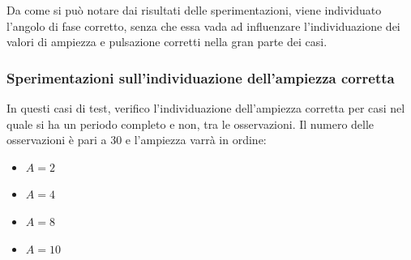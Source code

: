 \documentclass[a4paper,12pt]{report}
\begin{document}
Da come si può notare dai risultati delle sperimentazioni, viene individuato l'angolo di fase corretto, senza che essa vada ad influenzare l'individuazione dei valori di ampiezza e pulsazione corretti nella gran parte dei casi.

\subsubsection{Sperimentazioni sull'individuazione dell'ampiezza corretta}
In questi casi di test, verifico l'individuazione dell'ampiezza corretta per casi nel quale si ha un periodo completo e non, tra le osservazioni. Il numero delle osservazioni è pari a 30 e  l'ampiezza varrà in ordine:
\begin{itemize}
  \item $A = 2$
  \item $A = 4$
  \item $A = 8$
  \item $A = 10$
\end{itemize}
\end{document}
